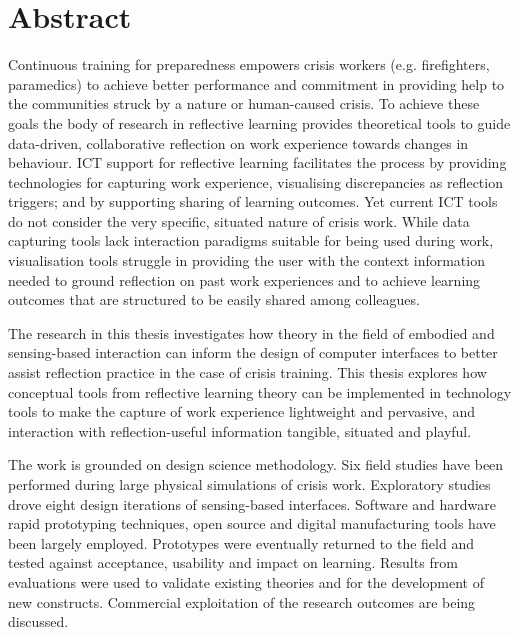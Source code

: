 \chapter{Abstract}

Continuous training for preparedness empowers crisis workers (e.g. firefighters, paramedics) to achieve better performance and commitment in providing help to the communities struck by a nature or human-caused crisis. To achieve these goals the body of research in reflective learning provides theoretical tools to guide data-driven, collaborative reflection on work experience towards changes in behaviour. ICT support for reflective learning facilitates the process by providing technologies for capturing work experience, visualising discrepancies as reflection triggers; and by supporting sharing of learning outcomes. Yet current ICT tools do not consider the very specific, situated nature of crisis work. While data capturing tools lack interaction paradigms suitable for being used during work, visualisation tools struggle in providing the user with the context information needed to ground reflection on past work experiences and to achieve learning outcomes that are structured to be easily shared among colleagues.

The research in this thesis investigates how theory in the field of embodied and sensing-based interaction can inform the design of computer interfaces to better assist reflection practice in the case of crisis training. This thesis explores how conceptual tools from reflective learning theory can be implemented in technology tools to make the capture of work experience lightweight and pervasive, and interaction with reflection-useful information tangible, situated and playful.

The work is grounded on design science methodology. Six field studies have been performed during large physical simulations of crisis work. Exploratory studies drove eight design iterations of sensing-based interfaces. Software and hardware rapid prototyping techniques, open source and digital manufacturing tools have been largely employed. Prototypes were eventually returned to the field and tested against acceptance, usability and impact on learning. Results from evaluations were used to validate existing theories and for the development of new constructs. Commercial exploitation of the research outcomes are being discussed.

